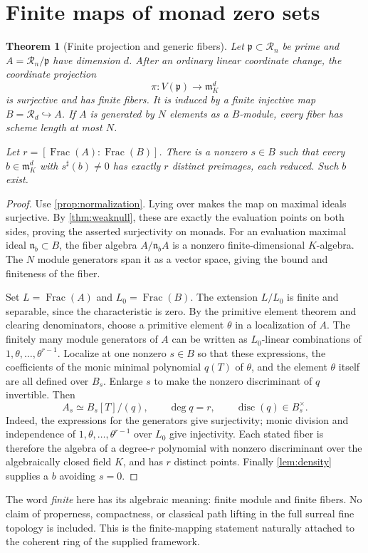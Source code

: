 \documentclass[11pt]{article}
\newtheorem{theorem}{Theorem}[section]
\theoremstyle{definition}
\newcommand{\RR}{\mathscr R}
\newcommand{\mm}{\mathfrak m}
\newcommand{\pp}{\mathfrak p}
\newcommand{\Frac}{\operatorname{Frac}}
\newcommand{\disc}{\operatorname{disc}}
\newcommand{\sh}{^{\sharp}}
\begin{document}
\section{Finite maps of monad zero sets}\label{sec:finite}
\begin{theorem}[Finite projection and generic fibers]\label{thm:finitemap}
Let $\pp\subset\RR_n$ be prime and $A=\RR_n/\pp$ have dimension $d$. After an ordinary linear coordinate change, the coordinate projection
\[
 \pi:V(\pp)\longrightarrow\mm_K^d
\]
is surjective and has finite fibers. It is induced by a finite injective map $B=\RR_d\hookrightarrow A$. If $A$ is generated by $N$ elements as a $B$-module, every fiber has scheme length at most $N$.

Let $r=[\Frac(A):\Frac(B)]$. There is a nonzero $s\in B$ such that every $b\in\mm_K^d$ with $s\sh(b)\ne0$ has exactly $r$ distinct preimages, each reduced. Such $b$ exist.
\end{theorem}
\begin{proof}
Use \cref{prop:normalization}. Lying over makes the map on maximal ideals surjective. By \cref{thm:weaknull}, these are exactly the evaluation points on both sides, proving the asserted surjectivity on monads. For an evaluation maximal ideal $\mathfrak n_b\subset B$, the fiber algebra $A/\mathfrak n_bA$ is a nonzero finite-dimensional $K$-algebra. The $N$ module generators span it as a vector space, giving the bound and finiteness of the fiber.

Set $L=\Frac(A)$ and $L_0=\Frac(B)$. The extension $L/L_0$ is finite and separable, since the characteristic is zero. By the primitive element theorem and clearing denominators, choose a primitive element $\theta$ in a localization of $A$. The finitely many module generators of $A$ can be written as $L_0$-linear combinations of $1,\theta,\ldots,\theta^{r-1}$. Localize at one nonzero $s\in B$ so that these expressions, the coefficients of the monic minimal polynomial $q(T)$ of $\theta$, and the element $\theta$ itself are all defined over $B_s$. Enlarge $s$ to make the nonzero discriminant of $q$ invertible. Then
\[
 A_s\simeq B_s[T]/(q),\qquad \deg q=r,\qquad\disc(q)\in B_s^\times.
\]
Indeed, the expressions for the generators give surjectivity; monic division and independence of $1,\theta,\ldots,\theta^{r-1}$ over $L_0$ give injectivity. Each stated fiber is therefore the algebra of a degree-$r$ polynomial with nonzero discriminant over the algebraically closed field $K$, and has $r$ distinct points. Finally \cref{lem:density} supplies a $b$ avoiding $s=0$.
\end{proof}
The word \emph{finite} here has its algebraic meaning: finite module and finite fibers. No claim of properness, compactness, or classical path lifting in the full surreal fine topology is included. This is the finite-mapping statement naturally attached to the coherent ring of the supplied framework.
\end{document}
